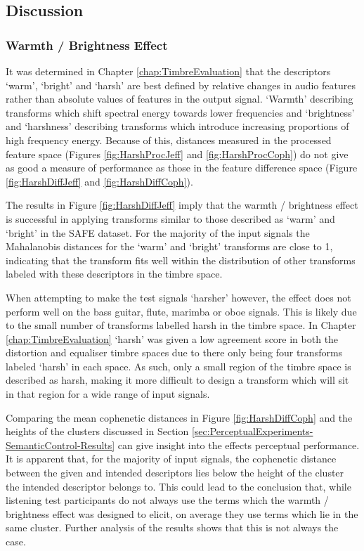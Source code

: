 	\subsection{Discussion}
	\label{sec:PerceptualExperiments-SemanticControl-Discussion}
		\subsubsection*{Warmth / Brightness Effect}
			It was determined in Chapter \ref{chap:TimbreEvaluation} that the descriptors `warm', `bright' and
			`harsh' are best defined by relative changes in audio features rather than absolute values of
			features in the output signal. `Warmth' describing transforms which shift spectral energy towards
			lower frequencies and `brightness' and `harshness' describing transforms which introduce increasing
			proportions of high frequency energy. Because of this, distances measured in the processed feature
			space (Figures \ref{fig:HarshProcJeff} and \ref{fig:HarshProcCoph}) do not give as good a measure
			of performance as those in the feature difference space (Figure \ref{fig:HarshDiffJeff} and
			\ref{fig:HarshDiffCoph}).

			The results in Figure \ref{fig:HarshDiffJeff} imply that the warmth / brightness effect is
			successful in applying transforms similar to those described as `warm' and `bright' in the SAFE
			dataset. For the majority of the input signals the Mahalanobis distances for the `warm' and
			`bright' transforms are close to 1, indicating that the transform fits well within the distribution
			of other transforms labeled with these descriptors in the timbre space.
			
			When attempting to make the test signals `harsher' however, the effect does not perform well on the
			bass guitar, flute, marimba or oboe signals. This is likely due to the small number of transforms
			labelled harsh in the timbre space. In Chapter \ref{chap:TimbreEvaluation} `harsh' was given a low
			agreement score in both the distortion and equaliser timbre spaces due to there only being four
			transforms labeled `harsh' in each space. As such, only a small region of the timbre space is
			described as harsh, making it more difficult to design a transform which will sit in that region
			for a wide range of input signals.
			
			Comparing the mean cophenetic distances in Figure \ref{fig:HarshDiffCoph} and the heights of the
			clusters discussed in Section \ref{sec:PerceptualExperiments-SemanticControl-Results} can give
			insight into the effects perceptual performance. It is apparent that, for the majority of input
			signals, the cophenetic distance between the given and intended descriptors lies below the height
			of the cluster the intended descriptor belongs to. This could lead to the conclusion that, while
			listening test participants do not always use the terms which the warmth / brightness effect was
			designed to elicit, on average they use terms which lie in the same cluster. Further analysis of
			the results shows that this is not always the case. 

